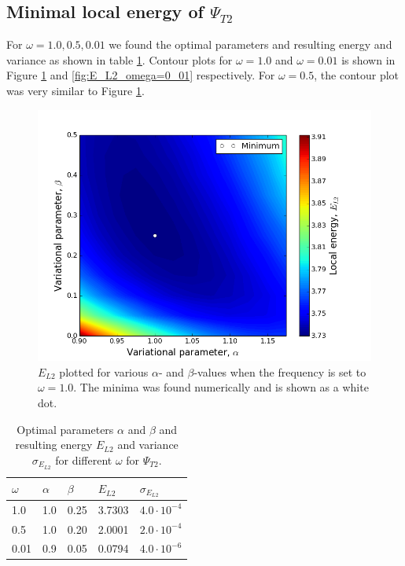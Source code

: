 \documentclass[norsk,a4paper,12pt]{article}
\begin{document}
\subsection{Minimal local energy of $\Psi_{T2}$}
For $\omega = 1.0, 0.5, 0.01$ we found the optimal parameters and resulting energy and variance as shown in table \ref{tab:Psi2results}. Contour plots for $\omega = 1.0$ and $\omega =0.01$ is shown in Figure \ref{fig:E_L2_omega=1_0} and \ref{fig:E_L2_omega=0_01} respectively. For $\omega = 0.5$, the contour plot was very similar to Figure \ref{fig:E_L2_omega=1_0}. 
\begin{figure} [H]
    \centering
    \includegraphics[width=12cm]{E_L2_contour_omega=1_0.png}
    \caption{$E_{L2}$ plotted for various $\alpha$- and $\beta$-values when the frequency is set to $\omega=1.0$. The minima was found numerically and is shown as a white dot.}
    \label{fig:E_L2_omega=1_0}
\end{figure}

\begin{table} [H]
\centering
\caption{Optimal parameters $\alpha$ and $\beta$ and resulting energy $E_{L2}$ and variance $\sigma_{E_{L2}}$ for different $\omega$ for $\Psi_{T2}$.}
\begin{tabularx}{\textwidth}{XXXXX} \hline
\label{tab:Psi2results}
$\omega$ & $\alpha$ & $\beta$ & $E_{L2}$ & $\sigma_{E_{L2}}$ \\ \hline
1.0 & 1.0 & 0.25 & 3.7303 & $4.0\cdot 10^{-4}$ \\
0.5 & 1.0 & 0.20 & 2.0001 & $2.0\cdot 10^{-4}$ \\
0.01 & 0.9 & 0.05 & 0.0794 & $4.0\cdot 10^{-6}$ \\ \hline
\end{tabularx}
\end{table}
\end{document}
